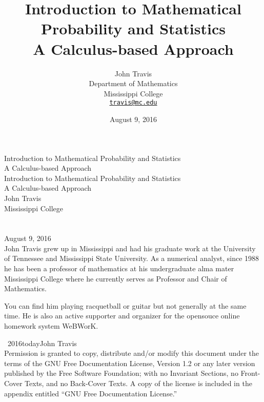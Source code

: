 \documentclass[10pt,]{book}
\title{Introduction to Mathematical Probability and Statistics\\
{\large A Calculus-based Approach}}
\author{John Travis\\
Department of Mathematics\\
Mississippi College\\
\href{mailto:travis@mc.edu}{\nolinkurl{travis@mc.edu}}
}
\date{August 9, 2016}
\theoremstyle{plain}
\theoremstyle{definition}
\theoremstyle{definition}
\numberwithin{equation}{section}
\begin{document}
\frontmatter
\thispagestyle{empty}
{\centering
\vspace*{0.28\textheight}
{\Huge Introduction to Mathematical Probability and Statistics}\\[2\baselineskip]
{\LARGE A Calculus-based Approach}\\
}
\clearpage
\thispagestyle{empty}
\null%
\clearpage
\thispagestyle{empty}
{\centering
\vspace*{0.14\textheight}
{\Huge Introduction to Mathematical Probability and Statistics}\\[\baselineskip]
{\LARGE A Calculus-based Approach}\\[3\baselineskip]
{\Large John Travis}\\[0.5\baselineskip]
{\Large Mississippi College}\\[3\baselineskip]
{\Large }\\[0.5\baselineskip]
{\normalsize }\\[3\baselineskip]
{\Large August 9, 2016}\\}
\clearpage
\thispagestyle{empty}
\noindent
John Travis grew up in Mississippi and had his graduate work at the University of Tennessee and Mississippi State University. As a numerical analyst, since 1988 he has been a professor of mathematics at his undergraduate alma mater Mississippi College where he currently serves as Professor and Chair of Mathematics.%
\par
You can find him playing racquetball or guitar but not generally at the same time. He is also an active supporter and organizer for the opensouce online homework system WeBWorK.%
\par
{}
\noindent\textcopyright\ 2016\textendash{}today\quad{}John Travis\\[0.5\baselineskip]
Permission is granted to copy, distribute and/or modify this document under the terms of the GNU Free Documentation License, Version 1.2 or any later version published by the Free Software Foundation; with no Invariant Sections, no Front-Cover Texts, and no Back-Cover Texts.  A copy of the license is included in the appendix entitled ``GNU Free Documentation License.''\par
{}
\null\clearpage
\end{document}
